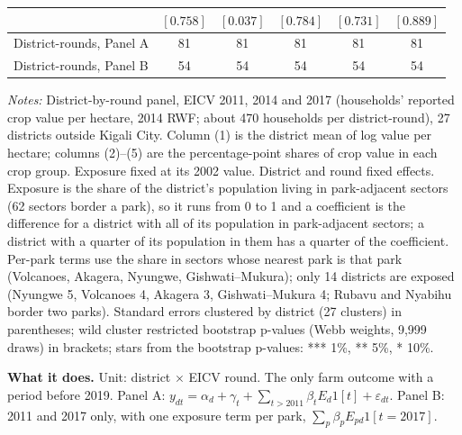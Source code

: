 \documentclass[11pt]{article}
\begin{document}
\begin{table}[H]
\begin{tabular}{lccccc}
 & $[0.758]$ & $[0.037]$ & $[0.784]$ & $[0.731]$ & $[0.889]$ \\
\midrule
District-rounds, Panel A & 81 & 81 & 81 & 81 & 81 \\
District-rounds, Panel B & 54 & 54 & 54 & 54 & 54 \\
\bottomrule
\end{tabular}
\begin{minipage}{0.95\textwidth}\footnotesize
\textit{Notes:} District-by-round panel, EICV 2011, 2014 and 2017 (households' reported crop value per hectare, 2014 RWF; about 470 households per district-round), 27 districts outside Kigali City. Column (1) is the district mean of log value per hectare; columns (2)--(5) are the percentage-point shares of crop value in each crop group. Exposure fixed at its 2002 value. District and round fixed effects. Exposure is the share of the district's population living in park-adjacent sectors (62 sectors border a park), so it runs from 0 to 1 and a coefficient is the difference for a district with all of its population in park-adjacent sectors; a district with a quarter of its population in them has a quarter of the coefficient. Per-park terms use the share in sectors whose nearest park is that park (Volcanoes, Akagera, Nyungwe, Gishwati--Mukura); only 14 districts are exposed (Nyungwe 5, Volcanoes 4, Akagera 3, Gishwati--Mukura 4; Rubavu and Nyabihu border two parks). Standard errors clustered by district (27 clusters) in parentheses; wild cluster restricted bootstrap p-values (Webb weights, 9,999 draws) in brackets; stars from the bootstrap p-values: *** 1\%, ** 5\%, * 10\%.
\end{minipage}
\end{table}
\textbf{What it does.} Unit: district $\times$ EICV round. The only farm outcome with a period before 2019. Panel A: $y_{dt} = \alpha_d + \gamma_t + \sum_{t>2011}\beta_t E_d 1[t] + \varepsilon_{dt}$. Panel B: 2011 and 2017 only, with one exposure term per park, $\sum_p \beta_p E_{pd}1[t{=}2017]$.
\end{document}
